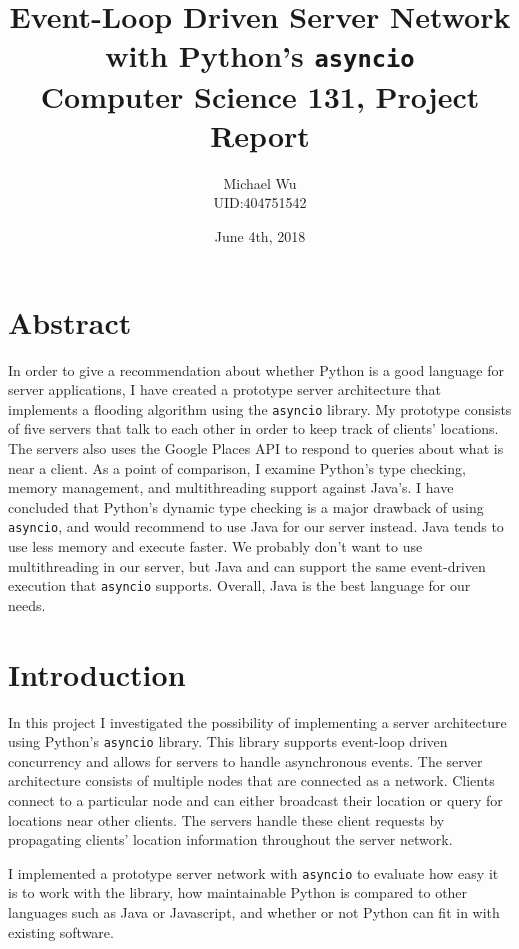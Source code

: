 \documentclass[letterpaper,twocolumn,10pt]{article}
\begin{document}
\title{\Large \bf Event-Loop Driven Server Network with Python's \texttt{asyncio}\\
\normalsize Computer Science 131, Project Report}
\author{Michael Wu\\UID:404751542}
\date{June 4th, 2018}
\maketitle

\section{Abstract}

In order to give a recommendation about whether Python is a good language for server applications, I have created a prototype server
architecture that implements a flooding algorithm using the \texttt{asyncio} library. My prototype consists of five servers that
talk to each other in order to keep track of clients' locations. The servers also uses the Google Places API to respond to queries about
what is near a client. As a point of comparison, I examine Python's type checking, memory management, and multithreading support against Java's.
I have concluded that Python's dynamic type checking is a major drawback of using \texttt{asyncio}, and would recommend to use Java
for our server instead. Java tends to use less memory and execute faster. We probably don't want to use multithreading in our server,
but Java and can support the same event-driven execution that \texttt{asyncio} supports. Overall, Java is the best language for
our needs.

\section{Introduction}

In this project I investigated the possibility of implementing a server architecture using Python's
\texttt{asyncio} library. This library supports event-loop driven concurrency and allows for servers
to handle asynchronous events. The server architecture consists of multiple nodes that are connected
as a network. Clients connect to a particular node and can either broadcast their location or query for
locations near other clients. The servers handle these client requests by propagating clients' location
information throughout the server network.

I implemented a prototype server network with \texttt{asyncio} to evaluate how easy it is to work with
the library, how maintainable Python is compared to other languages such as Java or Javascript, and whether
or not Python can fit in with existing software.
\end{document}
